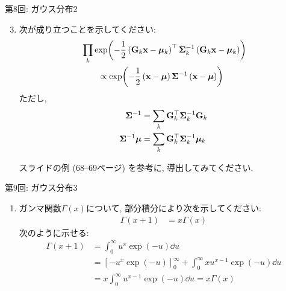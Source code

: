 \documentclass[dvipdfmx,notheorems,t]{beamer}
\begin{document}
\begin{frame}{第8回: ガウス分布2}
\begin{enumerate}
  \setcounter{enumi}{2}
  \item 次が成り立つことを示してください:
  \begin{align*}
    & \prod_k \exp(-\frac{1}{2} \left( \vb{G}_k \vb{x} - \vb*{\mu}_k \right)^\top
      \vb{\Sigma}_k^{-1} \left( \vb{G}_k \vb{x} - \vb*{\mu}_k \right)) \\
    & \qquad \propto \exp(-\frac{1}{2} \left( \vb{x} - \vb*{\mu} \right) \vb{\Sigma}^{-1}
      \left( \vb{x} - \vb*{\mu} \right))
  \end{align*}
  ただし,
  \begin{align*}
    \vb{\Sigma}^{-1} &= \sum_k \vb{G}_k^\top \vb{\Sigma}_k^{-1} \vb{G}_k \\
    \vb{\Sigma}^{-1} \vb*{\mu} &= \sum_k \vb{G}_k^\top \vb{\Sigma}_k^{-1} \vb*{\mu}_k
  \end{align*}

  スライドの例 (68--69ページ) を参考に, 導出してみてください.
\end{enumerate}
\end{frame}

\begin{frame}{第9回: ガウス分布3}
\begin{enumerate}
  \item ガンマ関数$\Gamma(x)$について, 部分積分により次を示してください:
  \begin{align*}
    \Gamma(x + 1) &= x \Gamma(x)
  \end{align*}
  次のように示せる:
  \begin{align*}
    \Gamma(x + 1) &= \int_0^\infty u^x \exp(-u) \dd{u} \\
      &= \left[ -u^x \exp(-u) \right]_0^\infty + \int_0^\infty x u^{x - 1} \exp(-u) \dd{u} \\
      &= x \int_0^\infty u^{x - 1} \exp(-u) \dd{u} = x \Gamma(x)
  \end{align*}
\end{enumerate}
\end{frame}
\end{document}

